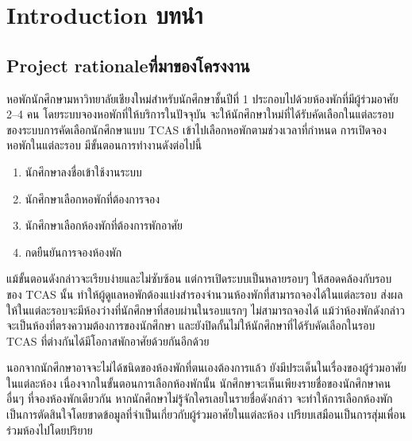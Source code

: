 \chapter{\ifenglish Introduction \else บทนำ\fi}
\section{\ifenglish Project rationale\else ที่มาของโครงงาน\fi}

หอพักนักศึกษามหาวิทยาลัยเชียงใหม่สำหรับนักศึกษาชั้นปีที่ 1 ประกอบไปด้วยห้องพักที่มีผู้ร่วมอาศัย 2–4 คน
โดยระบบจองหอพักที่ให้บริการในปัจจุบัน จะให้นักศึกษาใหม่ที่ได้รับคัดเลือกในแต่ละรอบของระบบการคัดเลือกนักศึกษาแบบ TCAS เข้าไปเลือกหอพักตามช่วงเวลาที่กำหนด
การเปิดจองหอพักในแต่ละรอบ มีขั้นตอนการทำงานดังต่อไปนี้
\begin{enumerate}
    \item นักศึกษาลงชื่อเข้าใช้งานระบบ
    \item นักศึกษาเลือกหอพักที่ต้องการจอง
    \item นักศึกษาเลือกห้องพักที่ต้องการพักอาศัย
    \item กดยืนยันการจองห้องพัก
\end{enumerate}
แม้ขั้นตอนดังกล่าวจะเรียบง่ายและไม่ซับซ้อน แต่การเปิดระบบเป็นหลายรอบๆ ให้สอดคล้องกับรอบของ TCAS นั้น ทำให้ผู้ดูแลหอพักต้องแบ่งสำรองจำนวนห้องพักที่สามารถจองได้ในแต่ละรอบ
ส่งผลให้ในแต่ละรอบจะมีห้องว่างที่นักศึกษาที่สอบผ่านในรอบแรกๆ ไม่สามารถจองได้ แม้ว่าห้องพักดังกล่าวจะเป็นห้องที่ตรงความต้องการของนักศึกษา 
และยังปิดกั้นไม่ให้นักศึกษาที่ได้รับคัดเลือกในรอบ TCAS ที่ต่างกันได้มีโอกาสพักอาศัยด้วยกันอีกด้วย

นอกจากนักศึกษาอาจจะไม่ได้ชนิดของห้องพักที่ตนเองต้องการแล้ว ยังมีประเด็นในเรื่องของผู้ร่วมอาศัยในแต่ละห้อง
เนื่องจากในขั้นตอนการเลือกห้องพักนั้น นักศึกษาจะเห็นเพียงรายชื่อของนักศึกษาคนอื่นๆ ที่จองห้องพักเดียวกัน หากนักศึกษาไม่รู้จักใครเลยในรายชื่อดังกล่าว จะทำให้การเลือกห้องพักเป็นการตัดสินใจโดยขาดข้อมูลที่จำเป็นเกี่ยวกับผู้ร่วมอาศัยในแต่ละห้อง เปรียบเสมือนเป็นการสุ่มเพื่อนร่วมห้องไปโดยปริยาย

